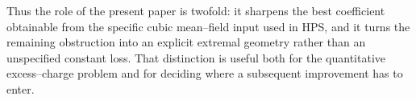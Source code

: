 Thus the role of the present paper is twofold: it sharpens the best coefficient obtainable from the specific cubic mean--field input used in HPS, and it turns the remaining obstruction into an explicit extremal geometry rather than an unspecified constant loss.  That distinction is useful both for the quantitative excess--charge problem and for deciding where a subsequent improvement has to enter.
